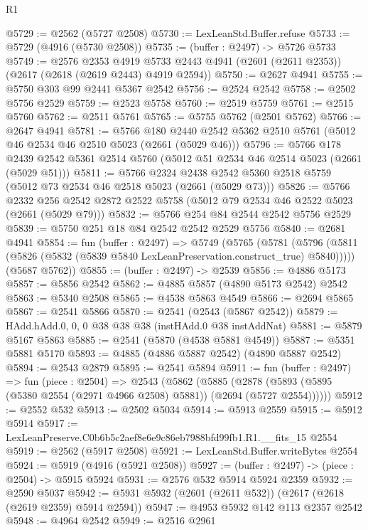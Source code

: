 \begin{lexlean}{R1}
\begin{coremodule}
@5729 := @2562 (@5727 @2508)
@5730 := LexLeanStd.Buffer.refuse
@5733 := @5729 (@4916 (@5730 @2508))
@5735 := (buffer : @2497) -> @5726 @5733
@5749 := @2576
    @2353
    @4919
    @5733
    @2443
    @4941
    (@2601 (@2611 @2353))
    (@2617 (@2618 (@2619 @2443) @4919 @2594))
@5750 := @2627 @4941
@5755 := @5750 @303 @99 @2441 @5367 @2542
@5756 := @2524 @2542
@5758 := @2502 @5756 @2529
@5759 := @2523 @5758
@5760 := @2519 @5759
@5761 := @2515 @5760
@5762 := @2511 @5761
@5765 := @5755 @5762 (@2501 @5762)
@5766 := @2647 @4941
@5781 := @5766
    @180
    @2440
    @2542
    @5362
    @2510
    @5761
    (@5012 @46 @2534 @46 @2510 @5023 (@2661 (@5029 @46)))
@5796 := @5766
    @178
    @2439
    @2542
    @5361
    @2514
    @5760
    (@5012 @51 @2534 @46 @2514 @5023 (@2661 (@5029 @51)))
@5811 := @5766
    @2324
    @2438
    @2542
    @5360
    @2518
    @5759
    (@5012 @73 @2534 @46 @2518 @5023 (@2661 (@5029 @73)))
@5826 := @5766
    @2332
    @256
    @2542
    @2872
    @2522
    @5758
    (@5012 @79 @2534 @46 @2522 @5023 (@2661 (@5029 @79)))
@5832 := @5766 @254 @84 @2544 @2542 @5756 @2529
@5839 := @5750 @251 @18 @84 @2542 @2542 @2529 @5756
@5840 := @2681 @4941
@5854 := fun (buffer : @2497) =>
  @5749
    (@5765
      (@5781 (@5796 (@5811 (@5826 (@5832 (@5839 @5840 LexLeanPreservation.construct_true) @5840)))))
      (@5687 @5762))
@5855 := (buffer : @2497) -> @2539
@5856 := @4886 @5173
@5857 := @5856 @2542
@5862 := @4885 @5857 (@4890 @5173 @2542) @2542
@5863 := @5340 @2508
@5865 := @4538 @5863 @4549
@5866 := @2694 @5865
@5867 := @2541 @5866
@5870 := @2541 (@2543 (@5867 @2542))
@5879 := HAdd.hAdd.{0, 0, 0} @38 @38 @38 (instHAdd.{0} @38 instAddNat)
@5881 := @5879 @5167 @5863
@5885 := @2541 (@5870 (@4538 @5881 @4549))
@5887 := @5351 @5881 @5170
@5893 := @4885 (@4886 @5887 @2542) (@4890 @5887 @2542)
@5894 := @2543 @2879
@5895 := @2541 @5894
@5911 := fun (buffer : @2497) =>
  fun (piece : @2504) =>
  @2543
    (@5862
      (@5885 (@2878 (@5893 (@5895 (@5380 @2554 (@2971 @4966 @2508) @5881)) (@2694 (@5727 @2554))))))
@5912 := @2552 @532
@5913 := @2502 @5034
@5914 := @5913 @2559
@5915 := @5912 @5914
@5917 := LexLeanPreserve.C0b6b5c2aef8e6e9c86eb7988bfd99fb1.R1.__fits_15 @2554
@5919 := @2562 (@5917 @2508)
@5921 := LexLeanStd.Buffer.writeBytes @2554
@5924 := @5919 (@4916 (@5921 @2508))
@5927 := (buffer : @2497) -> (piece : @2504) -> @5915 @5924
@5931 := @2576 @532 @5914 @5924 @2359
@5932 := @2590 @5037
@5942 := @5931 @5932 (@2601 (@2611 @532)) (@2617 (@2618 (@2619 @2359) @5914 @2594))
@5947 := @4953 @5932 @142 @113 @2357 @2542
@5948 := @4964 @2542
@5949 := @2516 @2961

\end{coremodule}
\end{lexlean}
